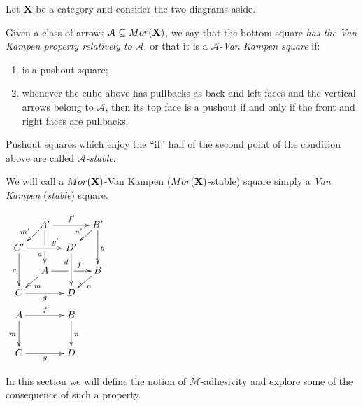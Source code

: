 \documentclass[a4paper,UKenglish,cleveref,pdftex, thm-restate,numberwithinsect]{lipics}
\newcommand{\mor}{\mathsf{Mor}}
\def\A{\textbf {\textup{A}}}
\def\C{\textbf {\textup{C}}}
\def\X{\textbf {\textup{X}}}
\begin{document}
\noindent 
\parbox{10cm}{\begin{definition} Let $\X$ be a category  and consider the two diagrams aside.

\hspace{15pt}Given  a class of arrows $\mathcal{A}\subseteq \mor(\X)$, we say that the bottom square \emph{has the Van Kampen property relatively to $\mathcal{A}$}, or that it  is a \emph{$\mathcal{A}$-Van Kampen square} if:
	\begin{enumerate}
		\item is a pushout square;
		\item 	whenever the cube above has pullbacks as back and left faces and the vertical arrows belong to $\mathcal{A}$, then its top face is a pushout if and only if the front and right faces are pullbacks.
	\end{enumerate}
	Pushout squares which enjoy the ``if'' half of the second point of the condition above are called \emph{$\mathcal{A}$-stable}. 
	
We will call a $\mor(\X)$-Van Kampen ($\mor(\X)$-stable) square simply a \emph{Van Kampen} (\emph{stable}) square.
\end{definition}}
\parbox{2cm}{$\xymatrix@C=10pt@R=10pt{&A'\ar[dd]|\hole_(.65){a}\ar[rr]^{f'} \ar[dl]_{m'} && B' \ar[dd]^{b} \ar[dl]_{n'} \\ C'  \ar[dd]_{c}\ar[rr]^(.7){g'} & & D' \ar[dd]_(.3){d}\\&A\ar[rr]|\hole^(.65){f} \ar[dl]^{m} && B \ar[dl]^{n} \\C \ar[rr]_{g} & & D \\A \ar[dd]_{m}\ar[rr]^{f}&&B\ar[dd]^{n}\\ \\C\ar[rr]_{g} &&D}$ }


In this section we will define the notion of $\mathcal{M}$-adhesivity \cite{azzi2019essence,ehrig2012,ehrig2014adhesive,heindel2009category,lack2005adhesive} and explore some of the consequence of such a property. 
\end{document}

